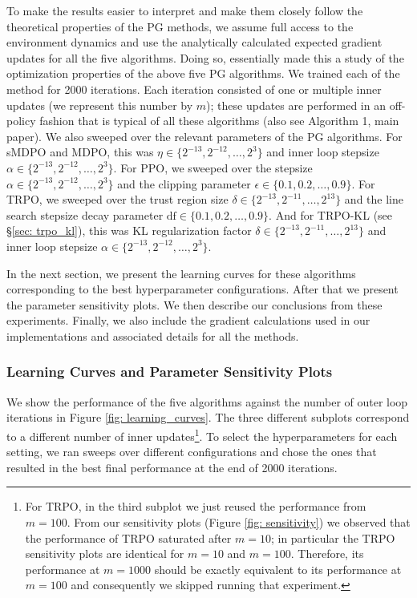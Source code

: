 \documentclass[a4paper, 10pt]{article}
\begin{document}
To make the results easier to interpret and make them closely follow the theoretical properties of the PG methods, we assume full access to the environment dynamics and use the analytically calculated expected gradient updates for all the five algorithms. Doing so, essentially made this a study of the optimization properties of the above five PG algorithms. We trained each of the method for 2000 iterations. Each iteration consisted of one or multiple inner updates (we represent this number by $m$); these updates are performed in an off-policy fashion that is typical of all these algorithms (also see Algorithm 1, main paper). We also sweeped over the relevant parameters of the PG algorithms. For sMDPO and MDPO, this was $\eta \in \{2^{-13}, 2^{-12}, \ldots, 2^3\}$ and inner loop stepsize $\alpha \in \{2^{-13}, 2^{-12}, \ldots, 2^3\}$. For PPO, we sweeped over the stepsize $\alpha \in \{2^{-13}, 2^{-12}, \ldots, 2^3\}$ and the clipping parameter $\epsilon \in \{0.1, 0.2, \ldots, 0.9\}$. For TRPO, we sweeped over the trust region size $\delta \in \{2^{-13}, 2^{-11}, \ldots, 2^{13}\}$ and the line search stepsize decay parameter $\text{df} \in \{0.1, 0.2, \ldots, 0.9\}$. And for TRPO-KL (see \S \ref{sec: trpo_kl}), this was KL regularization factor $\delta \in \{2^{-13}, 2^{-11}, \ldots, 2^{13}\}$ and inner loop stepsize $\alpha \in \{2^{-13}, 2^{-12}, \ldots, 2^3\}$.

In the next section, we present the learning curves for these algorithms corresponding to the best hyperparameter configurations. After that we present the parameter sensitivity plots. We then describe our conclusions from these experiments. Finally, we also include the gradient calculations used in our implementations and associated details for all the methods.

\subsubsection{Learning Curves and Parameter Sensitivity Plots}
We show the performance of the five algorithms against the number of outer loop iterations in Figure \ref{fig: learning_curves}. The three different subplots correspond to a different number of inner updates\footnote{For TRPO, in the third subplot we just reused the performance from $m=100$. From our sensitivity plots (Figure \ref{fig: sensitivity}) we observed that the performance of TRPO saturated after $m = 10$; in particular the TRPO sensitivity plots are identical for $m=10$ and $m=100$. Therefore, its performance at $m=1000$ should be exactly equivalent to its performance at $m=100$ and consequently we skipped running that experiment.}. To select the hyperparameters for each setting, we ran sweeps over different configurations and chose the ones that resulted in the best final performance at the end of 2000 iterations.
\end{document}
